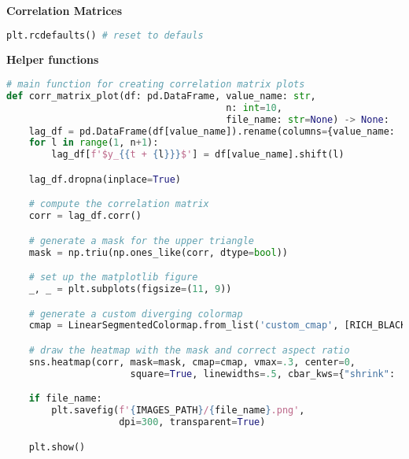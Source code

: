 \begin{center}
  \noindent\normalsize\bfseries
  Correlation Matrices
\end{center}\vspace{-17.5pt}

\begin{center}
  \begin{lstlisting}[language=Python]
plt.rcdefaults() # reset to defauls
  \end{lstlisting}
\end{center}

{\noindent\hspace{-12.5pt}\normalsize\bfseries Helper functions}\vspace{-10pt}
\begin{center}
  \begin{lstlisting}[language=Python]
# main function for creating correlation matrix plots
def corr_matrix_plot(df: pd.DataFrame, value_name: str, 
                                       n: int=10, 
                                       file_name: str=None) -> None:
    lag_df = pd.DataFrame(df[value_name]).rename(columns={value_name: '$y_t$'})
    for l in range(1, n+1):
        lag_df[f'$y_{{t + {l}}}$'] = df[value_name].shift(l)

    lag_df.dropna(inplace=True)

    # compute the correlation matrix
    corr = lag_df.corr()

    # generate a mask for the upper triangle
    mask = np.triu(np.ones_like(corr, dtype=bool))

    # set up the matplotlib figure
    _, _ = plt.subplots(figsize=(11, 9))

    # generate a custom diverging colormap
    cmap = LinearSegmentedColormap.from_list('custom_cmap', [RICH_BLACK, RED])

    # draw the heatmap with the mask and correct aspect ratio
    sns.heatmap(corr, mask=mask, cmap=cmap, vmax=.3, center=0,
                      square=True, linewidths=.5, cbar_kws={"shrink": .5})

    if file_name:
        plt.savefig(f'{IMAGES_PATH}/{file_name}.png', 
                    dpi=300, transparent=True)

    plt.show()
  \end{lstlisting}
\end{center}


